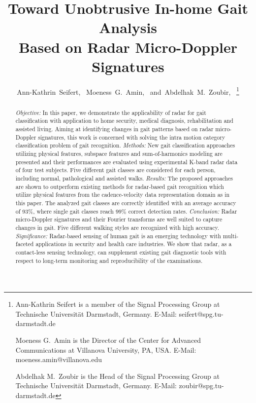 \documentclass[journal]{IEEEtran}
\begin{document}
\title{Toward Unobtrusive In-home Gait Analysis \\ Based on Radar Micro-Doppler Signatures}

\author{Ann-Kathrin~Seifert,~
        Moeness~G.~Amin,~
        and~Abdelhak~M.~Zoubir,~ 
        \thanks{
Ann-Kathrin Seifert is a member of the Signal Processing Group at Technische Universit\"at Darmstadt, Germany. E-Mail: seifert@spg.tu-darmstadt.de

Moeness G.~Amin is the Director of the Center for Advanced Communications at Villanova University, PA, USA. E-Mail: moeness.amin@villanova.edu

Abdelhak M.~Zoubir is the Head of the Signal Processing Group at Technische Universit\"at Darmstadt, Germany. E-Mail: zoubir@spg.tu-darmstadt.de
        }}%
\maketitle

\begin{abstract}
\textit{Objective:} In this paper, we demonstrate the applicability of radar for gait classification with application to home security, medical diagnosis, rehabilitation and assisted living. Aiming at identifying changes in gait patterns based on radar micro-Doppler signatures, this work is concerned with solving the intra motion category classification problem of gait recognition. 
\textit{Methods:} New gait classification approaches utilizing physical features, subspace features and sum-of-harmonics modeling are presented and their performances are evaluated using experimental K-band radar data of four test subjects. Five different gait classes are considered for each person, including normal, pathological and assisted walks. 
\textit{Results:} The proposed approaches are shown to outperform existing methods for radar-based gait recognition which utilize physical features from the cadence-velocity data representation domain as in this paper. The analyzed gait classes are correctly identified with an average accuracy of 93\%, where single gait classes reach 99\% correct detection rates.
\textit{Conclusion:} Radar micro-Doppler signatures and their Fourier transforms are well suited to capture changes in gait. Five different walking styles are recognized with high accuracy. 
\textit{Significance:} Radar-based sensing of human gait is an emerging technology with multi-faceted applications in security and health care industries. We show that radar, as a contact-less sensing technology, can supplement existing gait diagnostic tools with respect to long-term monitoring and reproducibility of the examinations.
\end{abstract}
\end{document}
